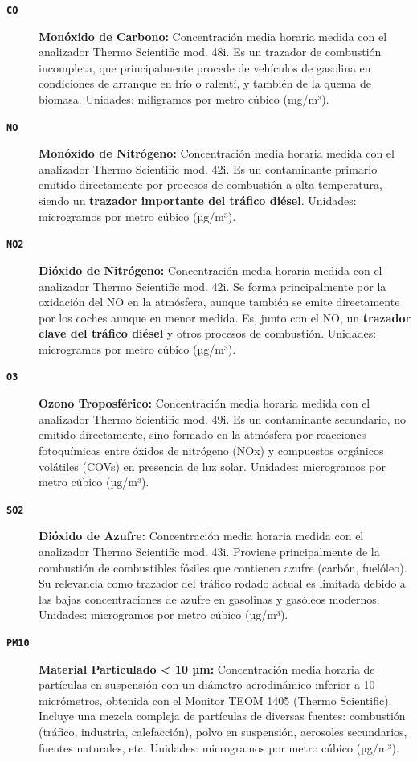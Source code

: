 \begin{description}
    \item[\textbf{\texttt{\MakeTextUppercase{co}}}] \textbf{Monóxido de Carbono:} Concentración media horaria medida con el analizador Thermo Scientific mod. 48i. Es un trazador de combustión incompleta, que principalmente procede de vehículos de gasolina en condiciones de arranque en frío o ralentí, y también de la quema de biomasa. Unidades: miligramos por metro cúbico (mg/m³).

    \item[\textbf{\texttt{\MakeUppercase{no}}}] \textbf{Monóxido de Nitrógeno:} Concentración media horaria medida con el analizador Thermo Scientific mod. 42i. Es un contaminante primario emitido directamente por procesos de combustión a alta temperatura, siendo un \textbf{trazador importante del tráfico diésel}. Unidades: microgramos por metro cúbico (µg/m³).

    \item[\textbf{\texttt{\MakeUppercase{no2}}}] \textbf{Dióxido de Nitrógeno:} Concentración media horaria medida con el analizador Thermo Scientific mod. 42i. Se forma principalmente por la oxidación del NO en la atmósfera, aunque también se emite directamente por los coches aunque en menor medida. Es, junto con el NO, un \textbf{trazador clave del tráfico diésel} y otros procesos de combustión. Unidades: microgramos por metro cúbico (µg/m³).

    \item[\textbf{\texttt{\MakeUppercase{o3}}}] \textbf{Ozono Troposférico:} Concentración media horaria medida con el analizador Thermo Scientific mod. 49i. Es un contaminante secundario, no emitido directamente, sino formado en la atmósfera por reacciones fotoquímicas entre óxidos de nitrógeno (NOx) y compuestos orgánicos volátiles (COVs) en presencia de luz solar. Unidades: microgramos por metro cúbico (µg/m³).

    \item[\textbf{\texttt{\MakeUppercase{so2}}}] \textbf{Dióxido de Azufre:} Concentración media horaria medida con el analizador Thermo Scientific mod. 43i. Proviene principalmente de la combustión de combustibles fósiles que contienen azufre (carbón, fuelóleo). Su relevancia como trazador del tráfico rodado actual es limitada debido a las bajas concentraciones de azufre en gasolinas y gasóleos modernos. Unidades: microgramos por metro cúbico (µg/m³).

    \item[\textbf{\texttt{\MakeUppercase{pm10}}}] \textbf{Material Particulado < 10 µm:} Concentración media horaria de partículas en suspensión con un diámetro aerodinámico inferior a 10 micrómetros, obtenida con el Monitor TEOM 1405 (Thermo Scientific). Incluye una mezcla compleja de partículas de diversas fuentes: combustión (tráfico, industria, calefacción), polvo en suspensión, aerosoles secundarios, fuentes naturales, etc. Unidades: microgramos por metro cúbico (µg/m³).


\end{description}
